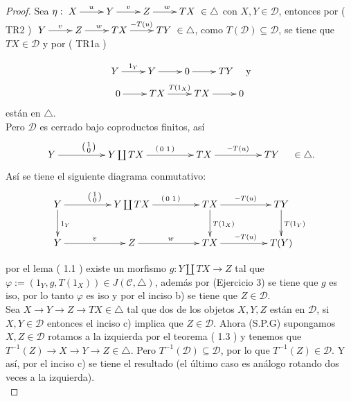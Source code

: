 \documentclass{article}
\newcommand{\spmat}[1]{%
  \left(\begin{smallmatrix}#1\end{smallmatrix}\right)%
}
\begin{document}
\begin{enumerate}
\begin{proof}
 Sea $\eta: \xymatrix{X\ar[r]^u & Y\ar[r]^v & Z\ar[r]^w & TX } \in \triangle$ con $X,Y\in \mathscr{D}$, entonces por ( TR2 ) 
$\xymatrix{Y\ar[r]^v & Z\ar[r]^w & TX\ar[r]^{-T(u)} & TY} \in \triangle$, como $T(\mathscr{D})\subseteq \mathscr{D}$, se tiene que $TX\in 
\mathscr{D}$ y por ( TR1a ) 

\begin{gather*}
\xymatrix{Y\ar[r]^{1_Y}&Y\ar[r]&0\ar[r]&TY}\quad \text{y}\\
\xymatrix{0\ar[r]&TX\ar[r]^{T(1_{X})}&TX\ar[r]&0}
\end{gather*}
están en $\triangle$.\\

Pero $\mathscr{D}$ es cerrado bajo coproductos finitos, así 
\begin{equation*}
\xymatrix@C+2pc{Y\ar[r]^{\spmat{1 \\ 0}} & Y\coprod TX\ar[r]^{\spmat{ 0 & 1}} & TX\ar[r]^{-T(u)} & TY}\quad \in \triangle .
\end{equation*}
Así se tiene el siguiente diagrama conmutativo:\\


\begin{equation*}
\xymatrix@C+2pc{Y\ar[r]^{\spmat{1 \\ 0}}\ar[d]^{1_Y} & Y\coprod TX\ar[r]^{\spmat{ 0 & 1}} & TX\ar[d]^{T(1_X)}\ar[r]^{-T(u)} 
& TY\ar[d]^{T(1_Y)}\\
Y\ar[r]^v & Z\ar[r]^w & TX\ar[r]^{-T(u)} & T(Y)}
\end{equation*}

por el lema ( 1.1 ) existe un morfismo $g:Y\coprod TX\longrightarrow Z$ tal que \\$\varphi:=(1_Y,g,T(1_X))\in J(\mathscr{C},\triangle)$, además por
 (Ejercicio 3) se tiene que $g$ es iso, por lo tanto $\varphi$ es iso y por el inciso b) se tiene que $Z\in \mathscr{D}$.\\

 Sea $X\to Y\to Z\to TX \in \triangle$ tal que dos de los objetos $X,Y,Z$ están en $\mathscr{D}$, si $X,Y\in \mathscr{D}$ entonces el 
inciso c) implica que $Z\in \mathscr{D}$. Ahora (S.P.G) supongamos $X,Z\in \mathscr{D}$ rotamos a la izquierda por el teorema ( 1.3 ) y tenemos 
que $T^{-1}(Z)\to X\to Y\to Z\in \triangle$. Pero $T^{-1}(\mathscr{D})\subseteq \mathscr{D}$, por lo que $T^{-1}(Z)\in \mathscr{D}$. 
Y así, por el inciso c) se tiene el resultado (el último caso es análogo rotando dos veces a la izquierda).\\


\end{proof}
\end{enumerate}
\end{document}
